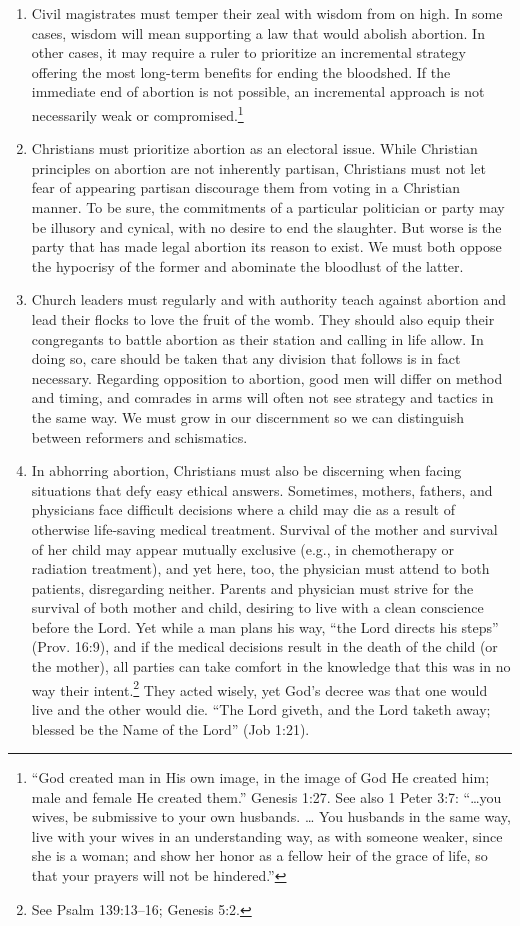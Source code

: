 \documentclass[
]{book}
\begin{document}
\begin{enumerate}
\item
  Civil magistrates must temper their zeal with wisdom from on high. In some cases, wisdom will mean supporting a law that would abolish abortion. In other cases, it may require a ruler to prioritize an incremental strategy offering the most long-term benefits for ending the bloodshed. If the immediate end of abortion is not possible, an incremental approach is not necessarily weak or compromised.\footnote{``God created man in His own image, in the image of God He created him; male and female He created them.'' Genesis 1:27. See also 1 Peter 3:7: ``\ldots you wives, be submissive to your own husbands. \ldots{} You husbands in the same way, live with your wives in an understanding way, as with someone weaker, since she is a woman; and show her honor as a fellow heir of the grace of life, so that your prayers will not be hindered.''}
\item
  Christians must prioritize abortion as an electoral issue. While Christian principles on abortion are not inherently partisan, Christians must not let fear of appearing partisan discourage them from voting in a Christian manner. To be sure, the commitments of a particular politician or party may be illusory and cynical, with no desire to end the slaughter. But worse is the party that has made legal abortion its reason to exist. We must both oppose the hypocrisy of the former and abominate the bloodlust of the latter.
\item
  Church leaders must regularly and with authority teach against abortion and lead their flocks to love the fruit of the womb. They should also equip their congregants to battle abortion as their station and calling in life allow. In doing so, care should be taken that any division that follows is in fact necessary. Regarding opposition to abortion, good men will differ on method and timing, and comrades in arms will often not see strategy and tactics in the same way. We must grow in our discernment so we can distinguish between reformers and schismatics.
\item
  In abhorring abortion, Christians must also be discerning when facing situations that defy easy ethical answers. Sometimes, mothers, fathers, and physicians face difficult decisions where a child may die as a result of otherwise life-saving medical treatment. Survival of the mother and survival of her child may appear mutually exclusive (e.g., in chemotherapy or radiation treatment), and yet here, too, the physician must attend to both patients, disregarding neither. Parents and physician must strive for the survival of both mother and child, desiring to live with a clean conscience before the Lord. Yet while a man plans his way, ``the Lord directs his steps'' (Prov. 16:9), and if the medical decisions result in the death of the child (or the mother), all parties can take comfort in the knowledge that this was in no way their intent.\footnote{See Psalm 139:13--16; Genesis 5:2.} They acted wisely, yet God's decree was that one would live and the other would die. ``The Lord giveth, and the Lord taketh away; blessed be the Name of the Lord'' (Job 1:21).

\end{enumerate}
\end{document}
